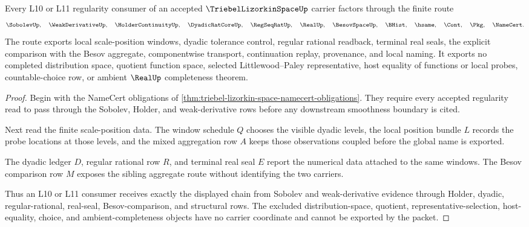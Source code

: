 \begin{theorem}
\label{thm:triebel-lizorkin-space-dyadic-scale-route}
Every L10 or L11 regularity consumer of an accepted $\TriebelLizorkinSpaceUp$ carrier factors through the finite route
$$
\SobolevUp,\quad \WeakDerivativeUp,\quad \HolderContinuityUp,\quad \DyadicRatCoreUp,\quad \RegSeqRatUp,\quad \RealUp,\quad \BesovSpaceUp,\quad \BHist,\quad \hsame,\quad \Cont,\quad \Pkg,\quad \NameCert .
$$
The route exports local scale-position windows, dyadic tolerance control, regular rational readback, terminal real seals, the explicit comparison with the Besov aggregate, componentwise transport, continuation replay, provenance, and local naming. It exports no completed distribution space, quotient function space, selected Littlewood--Paley representative, host equality of functions or local probes, countable-choice row, or ambient $\RealUp$ completeness theorem.
\end{theorem}
\begin{proof}
Begin with the NameCert obligations of \autoref{thm:triebel-lizorkin-space-namecert-obligations}. They require every accepted regularity read to pass through the Sobolev, Holder, and weak-derivative rows before any downstream smoothness boundary is cited.

Next read the finite scale-position data. The window schedule $Q$ chooses the visible dyadic levels, the local position bundle $L$ records the probe locations at those levels, and the mixed aggregation row $A$ keeps those observations coupled before the global name is exported.

The dyadic ledger $D$, regular rational row $R$, and terminal real seal $E$ report the numerical data attached to the same windows. The Besov comparison row $M$ exposes the sibling aggregate route without identifying the two carriers.

Thus an L10 or L11 consumer receives exactly the displayed chain from Sobolev and weak-derivative evidence through Holder, dyadic, regular-rational, real-seal, Besov-comparison, and structural rows. The excluded distribution-space, quotient, representative-selection, host-equality, choice, and ambient-completeness objects have no carrier coordinate and cannot be exported by the packet.
\end{proof}


